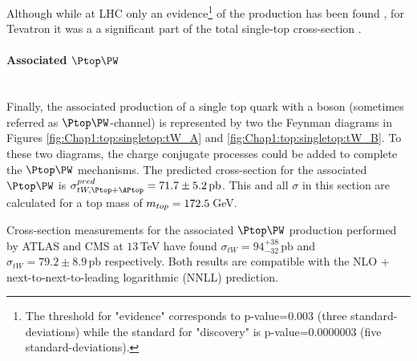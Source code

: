 Although while at LHC only an evidence\footnote{The threshold for "evidence" corresponds to 
p-value=0.003 (three standard-deviations) while the standard for "discovery" is 
p-value=0.0000003 (five standard-deviations). }
of the \schannel production has been found \cite{ATLAS:2022wfk}, for Tevatron it was a
a significant part of the total single-top cross-section \cite{Cremonesi:2014dma}. 


\paragraph{Associated $\Ptop\PW$}\mbox{}\\
Finally, the associated production of a single top quark with a \PW boson 
(sometimes referred as $\Ptop\PW$-channel) is represented by two the Feynman 
diagrams in Figures \ref{fig:Chap1:top:singletop:tW_A} and \ref{fig:Chap1:top:singletop:tW_B}.
To these two diagrams, the charge conjugate processes could be added to 
complete the $\Ptop\PW$ mechanisms. 
The predicted cross-section for the associated $\Ptop\PW$ is
$\sigma^{pred}_{tW, \Ptop + \APtop} = 71.7 \pm 5.2 \,\textrm{pb}$. This and 
all $\sigma$ in this section are calculated for a top mass of $m_{top} = 172.5\,$GeV.  

Cross-section measurements for the associated $\Ptop\PW$ production  
performed by ATLAS and CMS at $13\,$TeV have found
 $\sigma_{tW} = 94^{+38}_{-32} \,\textrm{pb}$ \cite{ATLAS:2016ofl}
and $\sigma_{tW} = 79.2\pm8.9\,\textrm{pb}$ \cite{CMS:2022xey} respectively. 
Both results are compatible with the NLO + next-to-next-to-leading logarithmic (NNLL) prediction.

